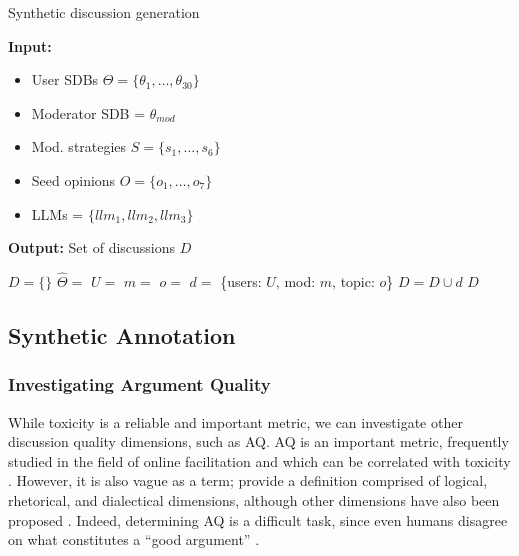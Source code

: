 \begin{algorithm}[t]
\caption{Synthetic discussion generation}
\label{alg:exp_generation}
\hspace*{\algorithmicindent} \textbf{Input:} 
         \begin{itemize}[noitemsep, nosep]
             \item User \acsp{SDB} $\Theta = \{\theta_1, \dots, \theta_{30}\}$
             \item Moderator \acs{SDB} = $\theta_{mod}$
             \item Mod. strategies $S = \{s_1, \ldots, s_6\}$
             \item Seed opinions $O = \{o_1, \ldots, o_7\}$
             \item \acp{LLM} = $\{llm_1, llm_2, llm_3\}$
         \end{itemize}
         \hspace*{\algorithmicindent} \textbf{Output:} Set of discussions $D$
\begin{algorithmic}[1]
    \State $D = \{\}$
                \State $\hat{\Theta} = $ 
                \State $U =$  
                \State $m = $ 
                \State $o = $ 
                \State $d =$ \{users: $U$, mod: $m$, topic: $o$\}
                \State $D = D \cup d$
            \EndFor
        \EndFor
    \EndFor
    \State \Return $D$
\end{algorithmic}
\end{algorithm}


\subsection{Synthetic Annotation}
\label{ssec:appendix:annotation}

\subsubsection{Investigating Argument Quality}

While toxicity is a reliable and important metric, we can investigate other discussion quality dimensions, such as \ac{AQ}. \ac{AQ} is an important metric, frequently studied in the field of online facilitation \cite{argyle2023, schroeder-etal-2024-fora, falk-etal-2024-moderation, falk-etal-2021-predicting} and which can be correlated with toxicity \cite{chang-danescu-niculescu-mizil-2019-trouble}. However, it is also vague as a term; \citet{wachsmuth-etal-2017-computational} provide a definition comprised of logical, rhetorical, and dialectical dimensions, although other dimensions have also been proposed \cite{habernal-gurevych-2016-argument, persing-ng-2015-modeling}. Indeed, determining \ac{AQ} is a difficult task, since even humans disagree on what constitutes a ``good argument” \cite{wachsmuth-etal-2017-computational, argyle2023}.

